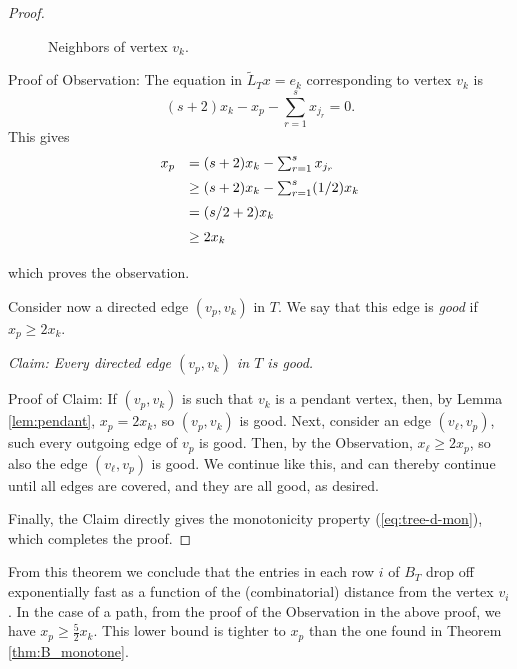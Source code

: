 \documentclass[12pt]{article}
\begin{document}
\begin{proof}
\begin{figure}
\caption{Neighbors of vertex $v_k$.}
\label{fig:subgr}
\end{figure}


 \bigskip

 Proof of Observation: The equation in $\tilde{L}_Tx=e_k$ corresponding to vertex $v_k$  is 
 \[
     (s+2)x_k-x_p-\sum_{r=1}^s x_{j_r}=0.
 \]
  This gives 
  \[
  \begin{array}{rl} \vspace{0.2cm}
         x_p&=(s+2)x_k-\sum_{r=1}^s x_{j_r} \\ \vspace{0.2cm}
               &\ge (s+2)x_k-\sum_{r=1}^s (1/2)x_k \\ \vspace{0.2cm}
               &= (s/2+2)x_k  \\ \vspace{0.2cm}
               &\ge 2x_k
  \end{array}       
 \]
 which proves the observation. 
 
 Consider now a directed edge $(v_p,v_k)$ in $T$.  We say that this edge is {\em good} if $x_p \ge 2 x_k$.
 
\smallskip
 {\em Claim: Every directed edge $(v_p,v_k)$ in $T$ is good.}
 
 \smallskip
 Proof of Claim: If $(v_p,v_k)$ is such that $v_k$ is a pendant vertex, then, by Lemma
 \ref{lem:pendant}, $x_p = 2 x_k$, so $(v_p,v_k)$ is good. Next, consider an edge $(v_{\ell},v_p)$, such every outgoing edge of $v_p$ is good. Then, by the Observation, $x_\ell \ge  2 x_p$, so also the edge $(v_{\ell},v_p)$ is good. We continue like this, and can thereby continue until all edges are covered, and they are all good, as desired. 
 
 Finally, the Claim directly gives the monotonicity property (\ref{eq:tree-d-mon}), which completes the proof.
 \end{proof}

From this theorem we conclude that the entries in each row $i$ of $B_T$ drop off exponentially fast as a function of the (combinatorial) distance from the vertex $v_i$.  
 In the case of a path, from the proof of the Observation in the above proof, we have $x_p \geq \frac{5}{2} x_k.$ This lower bound is tighter to $x_p$ than the one found in Theorem \ref{thm:B_monotone}.
\end{document}
